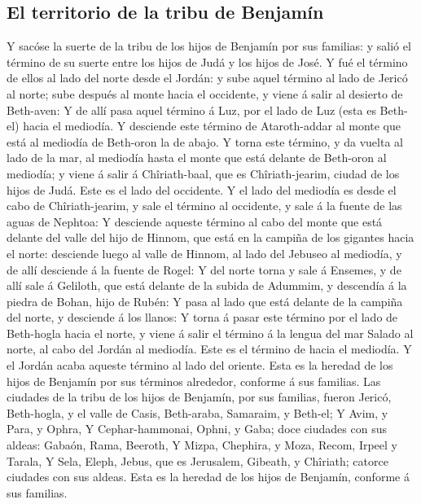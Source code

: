 \hypertarget{el-territorio-de-la-tribu-de-benjamuxedn}{%
\subsection{El territorio de la tribu de
Benjamín}\label{el-territorio-de-la-tribu-de-benjamuxedn}}

 Y sacóse la suerte de la tribu de los hijos de Benjamín
por sus familias: y salió el término de su suerte entre los hijos de
Judá y los hijos de José.  Y fué el término de ellos al
lado del norte desde el Jordán: y sube aquel término al lado de Jericó
al norte; sube después al monte hacia el occidente, y viene á salir al
desierto de Beth-aven:  Y de allí pasa aquel término á
Luz, por el lado de Luz (esta es Beth-el) hacia el mediodía. Y desciende
este término de Ataroth-addar al monte que está al mediodía de Beth-oron
la de abajo.  Y torna este término, y da vuelta al lado
de la mar, al mediodía hasta el monte que está delante de Beth-oron al
mediodía; y viene á salir á Chîriath-baal, que es Chîriath-jearim,
ciudad de los hijos de Judá. Este es el lado del occidente.
 Y el lado del mediodía es desde el cabo de
Chîriath-jearim, y sale el término al occidente, y sale á la fuente de
las aguas de Nephtoa:  Y desciende aqueste término al
cabo del monte que está delante del valle del hijo de Hinnom, que está
en la campiña de los gigantes hacia el norte: desciende luego al valle
de Hinnom, al lado del Jebuseo al mediodía, y de allí desciende á la
fuente de Rogel:  Y del norte torna y sale á Ensemes, y
de allí sale á Geliloth, que está delante de la subida de Adummim, y
descendía á la piedra de Bohan, hijo de Rubén:  Y pasa al
lado que está delante de la campiña del norte, y desciende á los llanos:
 Y torna á pasar este término por el lado de Beth-hogla
hacia el norte, y viene á salir el término á la lengua del mar Salado al
norte, al cabo del Jordán al mediodía. Este es el término de hacia el
mediodía.  Y el Jordán acaba aqueste término al lado del
oriente. Esta es la heredad de los hijos de Benjamín por sus términos
alrededor, conforme á sus familias.  Las ciudades de la
tribu de los hijos de Benjamín, por sus familias, fueron Jericó,
Beth-hogla, y el valle de Casis,  Beth-araba, Samaraim, y
Beth-el;  Y Avim, y Para, y Ophra,  Y
Cephar-hammonai, Ophni, y Gaba; doce ciudades con sus aldeas:
 Gabaón, Rama, Beeroth,  Y Mizpa,
Chephira, y Moza,  Recom, Irpeel y Tarala,
 Y Sela, Eleph, Jebus, que es Jerusalem, Gibeath, y
Chîriath; catorce ciudades con sus aldeas. Esta es la heredad de los
hijos de Benjamín, conforme á sus familias.


